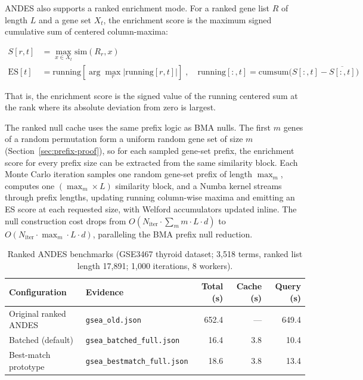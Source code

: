 \documentclass[11pt,a4paper]{article}
\begin{document}
ANDES also supports a ranked enrichment mode. For a ranked gene list $R$ of
length $L$ and a gene set $X_t$, the enrichment score is the maximum signed
cumulative sum of centered column-maxima:

\begin{align*}
	S[r, t]        & = \max_{x \in X_t} \mathrm{sim}(R_r, x) \\
	\mathrm{ES}[t] & =
	\mathrm{running}\!\left[\arg\max_r |\mathrm{running}[r,t]|\right]
	\;,\quad
	\mathrm{running}[:,t] = \mathrm{cumsum}\bigl(S[:,t] - \overline{S[:,t]}\bigr)
\end{align*}

That is, the enrichment score is the signed value of the running centered
sum at the rank where its absolute deviation from zero is largest.

The ranked null cache uses the same prefix logic as BMA nulls. The first $m$
genes of a random permutation form a uniform random gene set of size $m$
(Section~\ref{sec:prefix-proof}), so for each sampled gene-set prefix, the enrichment score for
every prefix size can be extracted from the same similarity block. Each Monte
Carlo iteration samples one random gene-set prefix of length $\max_m$,
computes one $(\max_m \times L)$ similarity block, and a Numba kernel streams
through prefix lengths, updating running column-wise maxima and emitting an
ES score at each requested size, with Welford accumulators updated inline.
The null construction cost drops from $O(N_\text{iter} \cdot \sum_m m \cdot
	L \cdot d)$ to $O(N_\text{iter} \cdot \max_m \cdot L \cdot d)$, paralleling
the BMA prefix null reduction.

\begin{table}[H]
	\centering
	\caption{Ranked ANDES benchmarks (GSE3467 thyroid dataset; 3{,}518 terms,
		ranked list length 17{,}891; 1{,}000 iterations, 8 workers).}
	\smallskip
	\small
	\begin{tabular}{@{}llrrr@{}}
		\toprule
		Configuration         & Evidence                            & Total (s) & Cache (s) & Query (s) \\
		\midrule
		Original ranked ANDES & \texttt{gsea\_old.json}             & 652.4     & ---       & 649.4     \\
		Batched (default)     & \texttt{gsea\_batched\_full.json}   & 16.4      & 3.8       & 10.4      \\
		Best-match prototype  & \texttt{gsea\_bestmatch\_full.json} & 18.6      & 3.8       & 13.4      \\
		\bottomrule
	\end{tabular}
\end{table}
\end{document}
